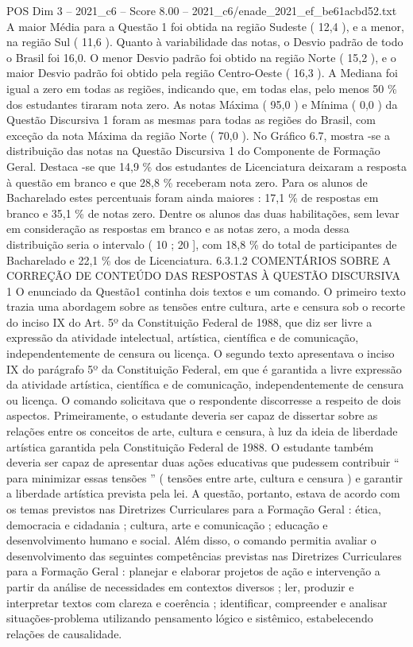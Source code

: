 \begin{textsample}{POS Dim 3 – 2021\_c6 – Score 8.00 – 2021\_c6/enade\_2021\_ef\_be61acbd52.txt}
A maior Média para a Questão 1 foi obtida na região Sudeste ( 12,4 ), e a menor, na região Sul ( 11,6 ).
Quanto à variabilidade das notas, o Desvio padrão de todo o Brasil foi 16,0.
O menor Desvio padrão foi obtido na região Norte ( 15,2 ), e o maior Desvio padrão foi obtido pela região Centro-Oeste ( 16,3 ).
A Mediana foi igual a zero em todas as regiões, indicando que, em todas elas, pelo menos 50 \% dos estudantes tiraram nota zero.
As notas Máxima ( 95,0 ) e Mínima ( 0,0 ) da Questão Discursiva 1 foram as mesmas para todas as regiões do Brasil, com exceção da nota Máxima da região Norte ( 70,0 ).
No Gráfico 6.7, mostra -se a distribuição das notas na Questão Discursiva 1 do Componente de Formação Geral.
Destaca -se que 14,9 \% dos estudantes de Licenciatura deixaram a resposta à questão em branco e que 28,8 \% receberam nota zero.
Para os alunos de Bacharelado estes percentuais foram ainda maiores : 17,1 \% de respostas em branco e 35,1 \% de notas zero.
Dentre os alunos das duas habilitações, sem levar em consideração as respostas em branco e as notas zero, a moda dessa distribuição seria o intervalo ( 10 ; 20 ], com 18,8 \% do total de participantes de Bacharelado e 22,1 \% dos de Licenciatura. 6.3.1.2 COMENTÁRIOS SOBRE A CORREÇÃO DE CONTEÚDO DAS RESPOSTAS À QUESTÃO DISCURSIVA 1 O enunciado da Questão1 continha dois textos e um comando.
O primeiro texto trazia uma abordagem sobre as tensões entre cultura, arte e censura sob o recorte do inciso IX do Art. 5º da Constituição Federal de 1988, que diz ser livre a expressão da atividade intelectual, artística, científica e de comunicação, independentemente de censura ou licença.
O segundo texto apresentava o inciso IX do parágrafo 5º da Constituição Federal, em que é garantida a livre expressão da atividade artística, científica e de comunicação, independentemente de censura ou licença.
O comando solicitava que o respondente discorresse a respeito de dois aspectos.
Primeiramente, o estudante deveria ser capaz de dissertar sobre as relações entre os conceitos de arte, cultura e censura, à luz da ideia de liberdade artística garantida pela Constituição Federal de 1988.
O estudante também deveria ser capaz de apresentar duas ações educativas que pudessem contribuir “ para minimizar essas tensões ” ( tensões entre arte, cultura e censura ) e garantir a liberdade artística prevista pela lei.
A questão, portanto, estava de acordo com os temas previstos nas Diretrizes Curriculares para a Formação Geral : ética, democracia e cidadania ; cultura, arte e comunicação ; educação e desenvolvimento humano e social.
Além disso, o comando permitia avaliar o desenvolvimento das seguintes competências previstas nas Diretrizes Curriculares para a Formação Geral : planejar e elaborar projetos de ação e intervenção a partir da análise de necessidades em contextos diversos ; ler, produzir e interpretar textos com clareza e coerência ; identificar, compreender e analisar situações-problema utilizando pensamento lógico e sistêmico, estabelecendo relações de causalidade.

\end{textsample}
